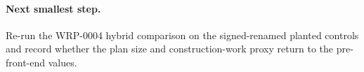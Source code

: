 \documentclass[11pt]{article}
\begin{document}
\paragraph{Next smallest step.} Re-run the WRP-0004 hybrid comparison on the
signed-renamed planted controls and record whether the plan size and
construction-work proxy return to the pre-front-end values.
\end{document}
